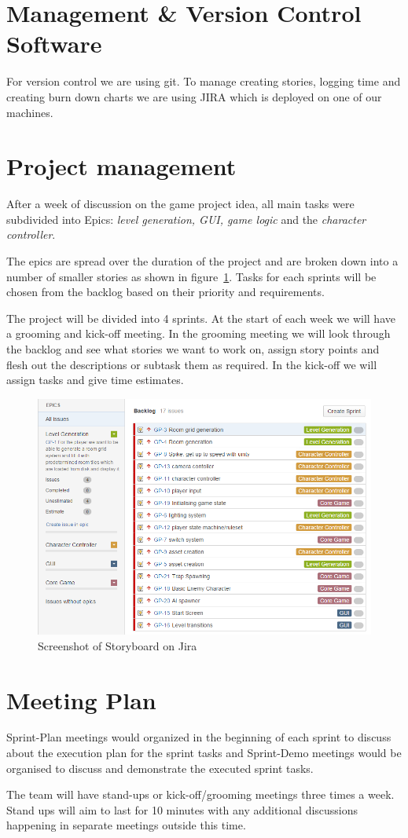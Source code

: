 \section{Management \& Version Control Software}
For version control we are using git. To manage creating stories, logging time and creating burn down charts we are using JIRA which is deployed on one of our machines.
\section{Project management}
After a week of discussion on the game project idea, all main tasks were subdivided into Epics: \textit{level generation, GUI, game logic} and the \textit{character controller}. 

The epics are spread over the duration of the project and are broken down into a number of smaller stories as shown in figure~\ref{fig:backlog}. Tasks for each sprints will be chosen from the backlog based on their priority and requirements.

The project will be divided into 4 sprints. At the start of each week we will have a grooming and kick-off meeting. In the grooming meeting we will look through the backlog and see what stories we want to work on, assign story points and flesh out the descriptions or subtask them as required. In the kick-off we will assign tasks and give time estimates.

\begin{figure}[ht]
\centering
\includegraphics[scale = 0.8]{images/backlog.png}
\caption{Screenshot of Storyboard on Jira}
\label{fig:backlog}
\end{figure}
\section{Meeting Plan}
Sprint-Plan meetings would organized in the beginning of each sprint to discuss about the execution plan for the sprint tasks and Sprint-Demo meetings would be organised to discuss and demonstrate the executed sprint tasks.

The team will have stand-ups or kick-off/grooming meetings three times a week. Stand ups will aim to last for 10 minutes with any additional discussions happening in separate meetings outside this time.